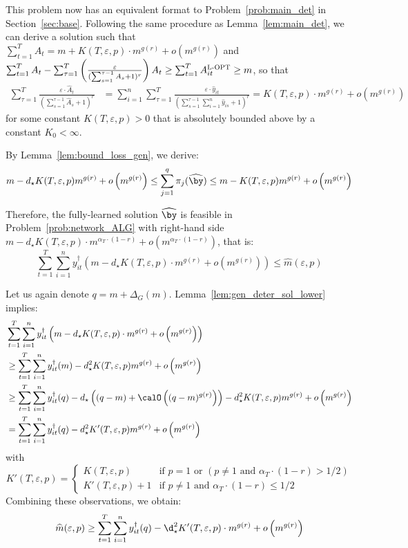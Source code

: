 \documentclass[blindrev]{informs3noheader}
\begin{document}
This problem now has an equivalent format to  Problem~\eqref{prob:main_det} in Section~\ref{sec:base}. Following the same procedure as Lemma~\ref{lem:main_det}, we can derive a solution such that $\sum_{t=1}^TA_t=m+K(T,\varepsilon,p)\cdot m^{g(r)}+o\left(m^{g(r)}\right)$ and $\sum_{t=1}^TA_t- \sum_{\tau=1}^T\left(\frac{\varepsilon}{(\sum_{s=1}^{\tau-1}A_s+1)^r}\right)A_t\geq\sum_{t=1}^T A^{\textsc{L-OPT}}_{it}\geq m$, so that
\begin{align*}
\sum_{\tau=1}^T\frac{\varepsilon\cdot \widehat{A}_t}{\left(\sum_{s=1}^{\tau-1}\widehat{A}_s+1\right)^r}
&= \sum_{i=1}^n\sum_{\tau=1}^T\frac{\varepsilon\cdot \widehat{y}_{it}}{\left(\sum_{s=1}^{\tau-1}\sum_{i=1}^n \widehat{y}_{is}+1\right)^r}
=K(T,\varepsilon,p)\cdot m^{g(r)} + o\left(m^{g(r)}\right)
\end{align*}
for some constant $K(T,\varepsilon,p)>0$ that is absolutely bounded above by a constant $K_0<\infty $.

By Lemma~\ref{lem:bound_loss_gen}, we derive:
$$m -d_\star K(T,\varepsilon,p)m^{g(r)}+o\left(m^{g(r)}\right)\leq \sum_{j=1}^q\pi_{j}(\widehat{\by})\leq m -K(T,\varepsilon,p)m^{g(r)}+o\left(m^{g(r)}\right)$$

Therefore, the fully-learned solution $\widehat{\by}$ is feasible in Problem~\eqref{prob:network_ALG} with right-hand side $m - d_\star K(T,\varepsilon,p)\cdot m^{\alpha_T \cdot (1-r)}+o\left(m^{\alpha_T\cdot(1-r)}\right)$, that is:
$$\sum_{t=1}^T \sum_{i=1}^n y_{it}^\dagger\left(m - d_\star K(T,\varepsilon,p)\cdot m^{g(r)}+o\left(m^{g(r)}\right)\right)\leq \widehat{m}(\varepsilon,p)$$

Let us again denote $q=m+\Delta_G(m)$. Lemma~\ref{lem:gen_deter_sol_lower} implies:
\begin{align*}
&\sum_{t=1}^T \sum_{i=1}^n y_{it}^\dagger\left(m - d_\star K(T,\varepsilon,p)\cdot m^{g(r)}+o\left(m^{g(r)}\right)\right)\\
&\geq \sum_{t=1}^T \sum_{i=1}^n y_{it}^\dagger(m)-d_\star^2 K(T,\varepsilon,p) m^{g(r)} + o\left(m^{g(r)}\right)\\
&\geq \sum_{t=1}^T \sum_{i=1}^n y_{it}^\dagger(q)-d_\star \left((q-m)+\calO\left((q-m)^{g(r)}\right)\right)-d_\star^2  K(T,\varepsilon,p) m^{g(r)} + o\left(m^{g(r)}\right)\\
&=	 \sum_{t=1}^T \sum_{i=1}^n y_{it}^\dagger(q)-d_\star^2 K'(T,\varepsilon,p) m^{g(r)} + o\left(m^{g(r)}\right) 
\end{align*}
with
$$K'(T,\varepsilon,p)=\begin{cases}
K(T,\varepsilon,p)& \text{if }p=1 \text{ or } (p \neq 1 \text{ and } \alpha_T\cdot(1-r)>1/2)\\
K'(T,\varepsilon,p)+1 & \text{if }p \neq 1\text{ and } \alpha_T\cdot(1-r)\leq 1/2        
\end{cases} $$
Combining these observations, we obtain:
$$\widehat{m}(\varepsilon,p)\geq\sum_{t=1}^T \sum_{i=1}^n y_{it}^\dagger(q)-\d_\star^2 K'(T,\varepsilon,p)\cdot m^{g(r)}+ o\left(m^{g(r)}\right)$$
\end{document}
